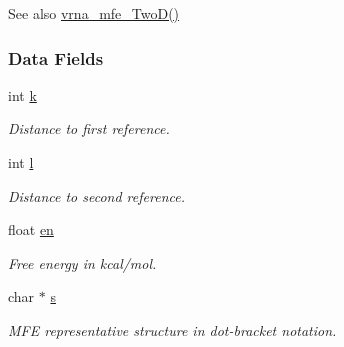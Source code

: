 \begin{DoxySeeAlso}{See also}
\hyperlink{group__kl__neighborhood__mfe_ga243c288b463147352829df04de6a2f77}{vrna\+\_\+mfe\+\_\+\+Two\+D()} 
\end{DoxySeeAlso}
\subsubsection*{Data Fields}
\begin{DoxyCompactItemize}
\item 
\mbox{\label{group__kl__neighborhood__mfe_ac111e850bb3b3a11b6b5707912cfa1b8}} 
int \hyperlink{group__kl__neighborhood__mfe_ac111e850bb3b3a11b6b5707912cfa1b8}{k}
\begin{DoxyCompactList}\small\item\em Distance to first reference. \end{DoxyCompactList}\item 
\mbox{\label{group__kl__neighborhood__mfe_ab8e95cd920901175a2cc8de726ab1d36}} 
int \hyperlink{group__kl__neighborhood__mfe_ab8e95cd920901175a2cc8de726ab1d36}{l}
\begin{DoxyCompactList}\small\item\em Distance to second reference. \end{DoxyCompactList}\item 
\mbox{\label{group__kl__neighborhood__mfe_a7577863a6a84224dfee39b321c03cab1}} 
float \hyperlink{group__kl__neighborhood__mfe_a7577863a6a84224dfee39b321c03cab1}{en}
\begin{DoxyCompactList}\small\item\em Free energy in kcal/mol. \end{DoxyCompactList}\item 
\mbox{\label{group__kl__neighborhood__mfe_ac5942d2505a6cd7e4a8073a321d5d2d5}} 
char $\ast$ \hyperlink{group__kl__neighborhood__mfe_ac5942d2505a6cd7e4a8073a321d5d2d5}{s}
\begin{DoxyCompactList}\small\item\em M\+FE representative structure in dot-\/bracket notation. \end{DoxyCompactList}\end{DoxyCompactItemize}
\label{structTwoDfold__vars}
